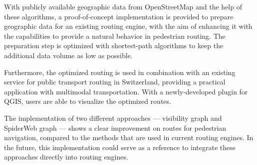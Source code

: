 With publicly available geographic data from OpenStreetMap and the help of these algorithms, a proof-of-concept implementation is provided to prepare geographic data for an existing routing engine, with the aim of enhancing it with the capabilities to provide a natural behavior in pedestrian routing. The preparation step is optimized with shortest-path algorithms to keep the additional data volume as low as possible.

Furthermore, the optimized routing is used in combination with an existing service for public transport routing in Switzerland, providing a practical application with multimodal transportation. With a newly-developed plugin for QGIS, users are able to visualize the optimized routes.

The implementation of two different approaches --- visibility graph and SpiderWeb graph --- shows a clear improvement on routes for pedestrian navigation, compared to the methods that are used in current routing engines. In the future, this implementation could serve as a reference to integrate these approaches directly into routing engines.